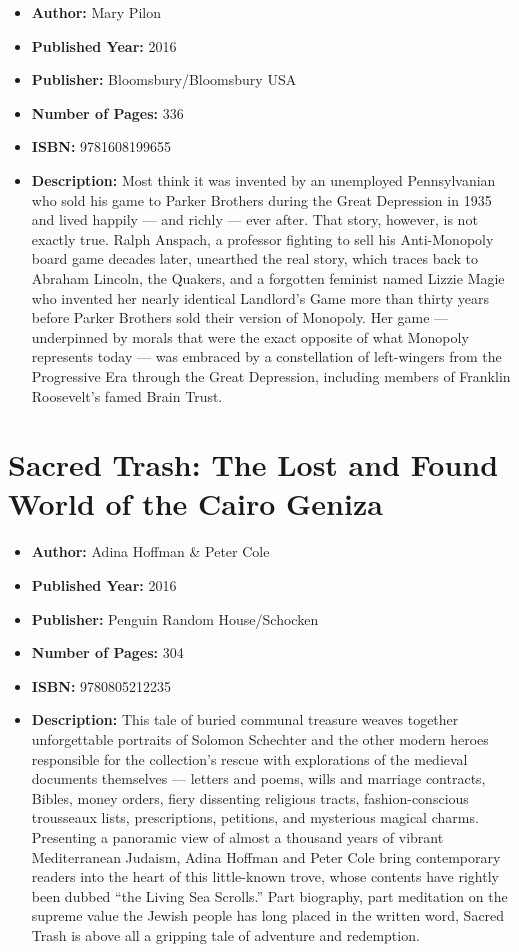\documentclass{tufte-handout}
\begin{document}
\begin{itemize}
    \item[] \textbf{Author:} Mary Pilon
    \item[] \textbf{Published Year:} 2016
    \item[] \textbf{Publisher:} Bloomsbury/Bloomsbury USA
    \item[] \textbf{Number of Pages:} 336
    \item[] \textbf{ISBN:} 9781608199655
    \item[] \textbf{Description:} Most think it was invented by an unemployed Pennsylvanian who sold his game to Parker Brothers during the Great Depression in 1935 and lived happily --- and richly --- ever after. That story, however, is not exactly true. Ralph Anspach, a professor fighting to sell his Anti-Monopoly board game decades later, unearthed the real story, which traces back to Abraham Lincoln, the Quakers, and a forgotten feminist named Lizzie Magie who invented her nearly identical Landlord's Game more than thirty years before Parker Brothers sold their version of Monopoly. Her game --- underpinned by morals that were the exact opposite of what Monopoly represents today --- was embraced by a constellation of left-wingers from the Progressive Era through the Great Depression, including members of Franklin Roosevelt's famed Brain Trust.
\end{itemize}

\section*{Sacred Trash: The Lost and Found World of the Cairo Geniza}
\begin{itemize}
    \item[] \textbf{Author:} Adina Hoffman \& Peter Cole
    \item[] \textbf{Published Year:} 2016
    \item[] \textbf{Publisher:} Penguin Random House/Schocken
    \item[] \textbf{Number of Pages:} 304 
    \item[] \textbf{ISBN:} 9780805212235
    \item[] \textbf{Description:} This tale of buried communal treasure weaves together unforgettable portraits of Solomon Schechter and the other modern heroes responsible for the collection’s rescue with explorations of the medieval documents themselves --- letters and poems, wills and marriage contracts, Bibles, money orders, fiery dissenting religious tracts, fashion-conscious trousseaux lists, prescriptions, petitions, and mysterious magical charms. Presenting a pan­oramic view of almost a thousand years of vibrant Mediterranean Judaism, Adina Hoffman and Peter Cole bring contemporary readers into the heart of this little-known trove, whose contents have rightly been dubbed “the Living Sea Scrolls.” Part biography, part meditation on the supreme value the Jewish people has long placed in the written word, Sacred Trash is above all a gripping tale of adventure and redemption. 
\end{itemize}
\end{document}
